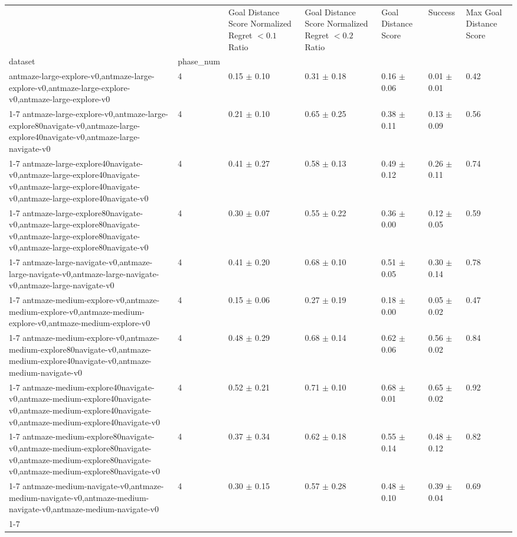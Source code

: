 \begin{tabular}{lllllll}
\toprule
 &  & Goal Distance Score Normalized Regret $< 0.1$ Ratio & Goal Distance Score Normalized Regret $< 0.2$ Ratio & Goal Distance Score & Success & Max Goal Distance Score \\
dataset & phase_num &  &  &  &  &  \\
\midrule
antmaze-large-explore-v0,antmaze-large-explore-v0,antmaze-large-explore-v0,antmaze-large-explore-v0 & 4 & 0.15 $\pm$ 0.10 & 0.31 $\pm$ 0.18 & 0.16 $\pm$ 0.06 & 0.01 $\pm$ 0.01 & 0.42 \\
\cline{1-7}
antmaze-large-explore-v0,antmaze-large-explore80navigate-v0,antmaze-large-explore40navigate-v0,antmaze-large-navigate-v0 & 4 & 0.21 $\pm$ 0.10 & 0.65 $\pm$ 0.25 & 0.38 $\pm$ 0.11 & 0.13 $\pm$ 0.09 & 0.56 \\
\cline{1-7}
antmaze-large-explore40navigate-v0,antmaze-large-explore40navigate-v0,antmaze-large-explore40navigate-v0,antmaze-large-explore40navigate-v0 & 4 & 0.41 $\pm$ 0.27 & 0.58 $\pm$ 0.13 & 0.49 $\pm$ 0.12 & 0.26 $\pm$ 0.11 & 0.74 \\
\cline{1-7}
antmaze-large-explore80navigate-v0,antmaze-large-explore80navigate-v0,antmaze-large-explore80navigate-v0,antmaze-large-explore80navigate-v0 & 4 & 0.30 $\pm$ 0.07 & 0.55 $\pm$ 0.22 & 0.36 $\pm$ 0.00 & 0.12 $\pm$ 0.05 & 0.59 \\
\cline{1-7}
antmaze-large-navigate-v0,antmaze-large-navigate-v0,antmaze-large-navigate-v0,antmaze-large-navigate-v0 & 4 & 0.41 $\pm$ 0.20 & 0.68 $\pm$ 0.10 & 0.51 $\pm$ 0.05 & 0.30 $\pm$ 0.14 & 0.78 \\
\cline{1-7}
antmaze-medium-explore-v0,antmaze-medium-explore-v0,antmaze-medium-explore-v0,antmaze-medium-explore-v0 & 4 & 0.15 $\pm$ 0.06 & 0.27 $\pm$ 0.19 & 0.18 $\pm$ 0.00 & 0.05 $\pm$ 0.02 & 0.47 \\
\cline{1-7}
antmaze-medium-explore-v0,antmaze-medium-explore80navigate-v0,antmaze-medium-explore40navigate-v0,antmaze-medium-navigate-v0 & 4 & 0.48 $\pm$ 0.29 & 0.68 $\pm$ 0.14 & 0.62 $\pm$ 0.06 & 0.56 $\pm$ 0.02 & 0.84 \\
\cline{1-7}
antmaze-medium-explore40navigate-v0,antmaze-medium-explore40navigate-v0,antmaze-medium-explore40navigate-v0,antmaze-medium-explore40navigate-v0 & 4 & 0.52 $\pm$ 0.21 & 0.71 $\pm$ 0.10 & 0.68 $\pm$ 0.01 & 0.65 $\pm$ 0.02 & 0.92 \\
\cline{1-7}
antmaze-medium-explore80navigate-v0,antmaze-medium-explore80navigate-v0,antmaze-medium-explore80navigate-v0,antmaze-medium-explore80navigate-v0 & 4 & 0.37 $\pm$ 0.34 & 0.62 $\pm$ 0.18 & 0.55 $\pm$ 0.14 & 0.48 $\pm$ 0.12 & 0.82 \\
\cline{1-7}
antmaze-medium-navigate-v0,antmaze-medium-navigate-v0,antmaze-medium-navigate-v0,antmaze-medium-navigate-v0 & 4 & 0.30 $\pm$ 0.15 & 0.57 $\pm$ 0.28 & 0.48 $\pm$ 0.10 & 0.39 $\pm$ 0.04 & 0.69 \\
\cline{1-7}
\bottomrule
\end{tabular}
